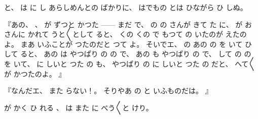 %
と、
%
は
に
し
あらしめんとの
ばかりに、
%
はでもの
とは
ひながら
ひ
しぬ。

%
『あの、
%
、
%
が
ずつと
かつた
{---}{---}
まだ
で、%
%
の
の
さんが
きて
た
に、
%
が
お
さんに
かれて
うと〳〵として
ると、
%
くの
くの
で
もつて
の
いたのが
えたのよ。
%
まあ
いふことが
つたのだと
つて
よ。
%
そいでエ、
%
の
あの
の
を
いて
ひ
して
ると、
%
あの
は
やつぱり
の
の
で、
%
あの
も
やつぱり
の
で、
%
して
の
の
を
いて、
%
に
しいと
つた
の
も、%
%
やつぱり
の
に
しいと
つた
の
だと、%
%
へて〳〵
が
かつたのよ。
』

%
『なんだエ、
%
また
らない！。
%
そりやあ
の
と
いふものだは。
』

%
が
かく
ひ
れる
、
%
は
また
に
べう〳〵と
けり。

